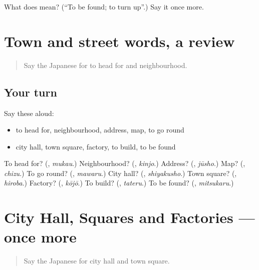 \begin{tcolorbox}[breakable,colback=teal!4,colframe=teal!35!black,title={Before you move on}]
What does  mean? (\textquotedblleft{}To be found; to turn up\textquotedblright{}.) Say it once more.
\end{tcolorbox}
\section[(dialogue)]{Town and street words, a review}

\label{lesson:JA-R197-review-196-197}



\begin{quote}
Say the Japanese for to head for and neighbourhood.
\end{quote}

\subsection*{Your turn}
Say these aloud:

\begin{itemize}
\raggedright
  \item to head for, neighbourhood, address, map, to go round
  \item city hall, town square, factory, to build, to be found
\end{itemize}

\begin{tcolorbox}[breakable,colback=teal!4,colframe=teal!35!black,title={Before you move on}]
To head for? (\textbf{}, \emph{mukau}.) Neighbourhood? (\textbf{}, \emph{kinjo}.) Address? (\textbf{}, \emph{jūsho}.) Map? (\textbf{}, \emph{chizu}.) To go round? (\textbf{}, \emph{mawaru}.) City hall? (\textbf{}, \emph{shiyakusho}.) Town square? (\textbf{}, \emph{hiroba}.) Factory? (\textbf{}, \emph{kōjō}.) To build? (\textbf{}, \emph{tateru}.) To be found? (\textbf{}, \emph{mitsukaru}.)
\end{tcolorbox}
\section[(dialogue)]{City Hall, Squares and Factories — once more}

\label{lesson:JA-R197-review-final-197}



\begin{quote}
Say the Japanese for city hall and town square.
\end{quote}

